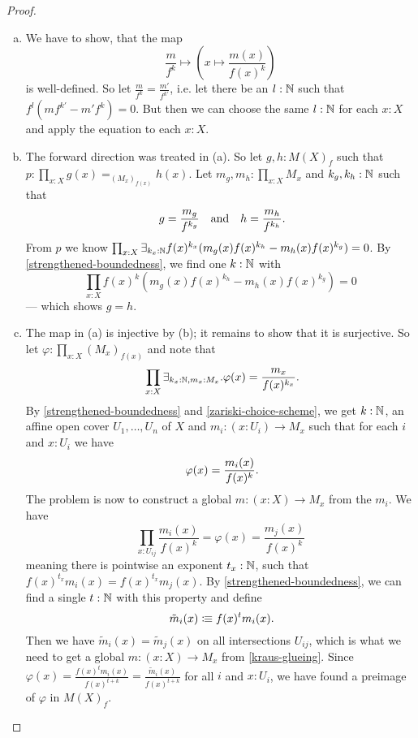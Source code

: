 \begin{proof}
  \begin{enumerate}[(a)]
  \item We have to show, that the map
    \[
      \frac{m}{f^k}\mapsto\left(x\mapsto \frac{m(x)}{f(x)^k}\right)
    \]
    is well-defined. So let $\frac{m}{f^k}=\frac{m'}{f^{k'}}$,
    i.e. let there be an $l:\mathbb{N}$ such that $f^l(mf^{k'}-m'f^k)=0$.
    But then we can choose the same $l:\mathbb{N}$ for each $x:X$
    and apply the equation to each $x:X$.
  \item The forward direction was treated in (a).
    So let $g,h:M(X)_f$ such that $p:\prod_{x:X}g(x)=_{(M_x)_{f(x)}}h(x)$.
    Let $m_g,m_h:\prod_{x:X} M_x$ and $k_g,k_h:\mathbb{N}$ such that
    \[
      g=\frac{m_g}{f^{k_g}} \quad\text{and}\quad h=\frac{m_h}{f^{k_h}}
      \rlap{.}
    \]
    From $p$ we know $\prod_{x:X}\exists_{k_x:\mathbb{N}}f(x)^{k_x}(m_g(x)f(x)^{k_h}-m_h(x)f(x)^{k_g})=0$.
    By \cref{strengthened-boundedness},
    we find one $k : \mathbb{N}$ with
    \[
      \prod_{x:X}f(x)^{k}(m_g(x)f(x)^{k_h}-m_h(x)f(x)^{k_g})=0
    \]
    --- which shows $g=h$.
  \item The map in (a) is injective by (b);
    it remains to show that it is surjective.
    So let $\varphi:\prod_{x:X}(M_x)_{f(x)}$ and
    note that
    \[
      \prod_{x:X}
      \exists_{k_x:\N,m_x:M_x}.
      \varphi(x)=\frac{m_x}{f(x)^{k_x}}
      \rlap{.}
    \]
    By \cref{strengthened-boundedness} and \cref{zariski-choice-scheme},
    we get $k:\mathbb{N}$, an affine open cover $U_1,\dots,U_n$ of $X$ and $m_i:(x : U_i)\to M_x$
    such that for each $i$ and $x:U_i$ we have
    \[
      \varphi(x)=\frac{m_i(x)}{f(x)^{k}}
      \rlap{.}
    \]
    The problem is now to construct a global $m:(x:X)\to M_x$ from the $m_i$.
    We have
    \[
        \prod_{x:U_{ij}}\frac{m_i(x)}{f(x)^k}=\varphi(x)=\frac{m_j(x)}{f(x)^k}
    \]
    meaning there is pointwise an exponent $t_x:\mathbb{N}$,
    such that $f(x)^{t_x}m_i(x)=f(x)^{t_x}m_j(x)$.
    By \cref{strengthened-boundedness},
    we can find a single $t:\mathbb{N}$ with this property and define
    \[
      \tilde{m}_i(x) \colonequiv f(x)^t m_i(x)
      \rlap{.}
    \]
    Then we have $\tilde{m}_i(x)=\tilde{m}_j(x)$ on all intersections $U_{ij}$,
    which is what we need to get a global $m:(x:X)\to M_x$ from \cref{kraus-glueing}.
    Since $\varphi(x)=\frac{f(x)^t m_i(x)}{f(x)^{t+k}}=\frac{\tilde{m}_i(x)}{f(x)^{t+k}}$
    for all $i$ and $x : U_i$,
    we have found a preimage of $\varphi$ in $M(X)_f$.
  \end{enumerate}
\end{proof}

